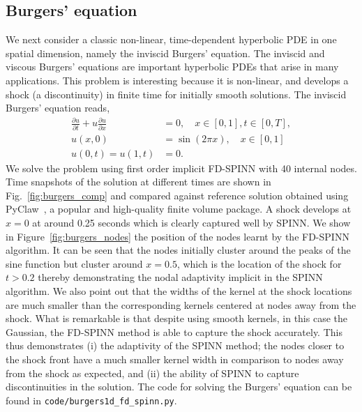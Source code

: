 \documentclass[12pt]{article}
\begin{document}
\subsection{Burgers' equation}
We next consider a classic non-linear, time-dependent hyperbolic PDE in one spatial dimension, namely the inviscid Burgers' equation. The inviscid and viscous Burgers' equations are important hyperbolic PDEs that arise in many applications.  This problem is interesting because it is non-linear, and develops a shock (a discontinuity) in finite time for initially smooth solutions. The inviscid Burgers' equation reads,
\begin{displaymath}
\begin{split}
\frac{\partial u}{\partial t} + u \frac{\partial u}{\partial x} &= 0,  \quad x \in [0, 1], t \in [0, T],\\
u(x, 0) &= \sin(2 \pi x),  \quad x \in [0, 1]\\
u(0, t) = u(1, t) &= 0.
\end{split}
\end{displaymath}
We solve the problem using first order implicit FD-SPINN with 40 internal nodes.  Time snapshots of the solution at different times are shown in Fig.~\ref{fig:burgers_comp} and compared against reference solution obtained using PyClaw~\cite{pyclaw}, a popular and high-quality finite volume package. A shock develops at $x=0$ at around 0.25 seconds which is clearly captured well by SPINN. We show in Figure~\ref{fig:burgers_nodes} the position of the nodes learnt by the FD-SPINN algorithm.  It can be seen that the nodes initially cluster around the peaks of the sine function but cluster around $x=0.5$, which is the location of the shock for $t> 0.2$ thereby demonstrating the nodal adaptivity implicit in the SPINN algorithm. We also point out that the widths of the kernel at the shock locations are much smaller than the corresponding kernels centered at nodes away from the shock. What is remarkable is that despite using smooth kernels, in this case the Gaussian, the FD-SPINN method is able to capture the shock accurately. This thus demonstrates (i) the adaptivity of the SPINN method; the nodes closer to the shock front have a much smaller kernel width in comparison to nodes away from the shock as expected, and (ii) the ability of SPINN to capture discontinuities in the solution. The code for solving the Burgers' equation can be found in \verb|code/burgers1d_fd_spinn.py|.
\end{document}

